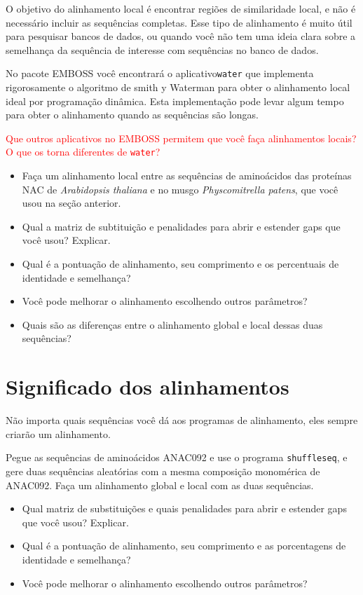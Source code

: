 \documentclass[letter,11pt]{book}
\begin{document}
O objetivo do alinhamento local é encontrar regiões de similaridade local, e não é necessário incluir as sequências completas. Esse tipo de alinhamento é muito útil para pesquisar bancos de dados, ou quando você não tem uma ideia clara sobre a semelhança da sequência de interesse com sequências no banco de dados.

No pacote EMBOSS você encontrará o aplicativo\Verb+water+ que implementa rigorosamente o algoritmo de  smith y Waterman \citep{Smith1981} para obter o alinhamento local ideal por programação dinâmica. Esta implementação pode levar algum tempo para obter o alinhamento quando as sequências são longas.

\textcolor{red}{Que outros aplicativos no EMBOSS permitem que você faça alinhamentos locais? O que os torna diferentes de \Verb+water+?}

{\color{red}
\begin{itemize}
\item Faça um alinhamento local entre as sequências de aminoácidos das proteínas NAC de \textit{Arabidopsis thaliana} e no musgo \textit{Physcomitrella patens}, que você usou na seção anterior.
\item Qual a matriz de subtituição e penalidades para abrir e estender gaps que você usou? Explicar.
\item Qual é a pontuação de alinhamento, seu comprimento e os percentuais de identidade e semelhança?
\item Você pode melhorar o alinhamento escolhendo outros parâmetros?
\item Quais são as diferenças entre o alinhamento global e local dessas duas sequências?
\end{itemize}
}

\section{Significado dos alinhamentos}

Não importa quais sequências você dá aos programas de alinhamento, eles sempre criarão um alinhamento.

Pegue as sequências de aminoácidos ANAC092 e use o programa \Verb+shuffleseq+, e gere duas sequências aleatórias com a mesma composição monomérica de ANAC092. Faça um alinhamento global e local com as duas sequências.

{\color{red}
\begin{itemize}
\item Qual matriz de substituições e quais penalidades para abrir e estender gaps que você usou? Explicar.
\item Qual é a pontuação de alinhamento, seu comprimento e as porcentagens de identidade e semelhança?
\item Você pode melhorar o alinhamento escolhendo outros parâmetros?
\end{itemize}
}
\end{document}
